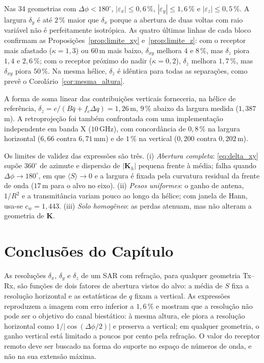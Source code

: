 \documentclass[12pt,a4paper,oneside]{book}
\theoremstyle{remark}
\newcommand{\vect}[1]{\boldsymbol{#1}}
\theoremstyle{plain}
\theoremstyle{definition}
\begin{document}
Nas 34 geometrias com $\Delta\phi<180^\circ$, $|\varepsilon_x|\le0,6\,\%$,
$|\varepsilon_y|\le1,6\,\%$ e $|\varepsilon_z|\le0,5\,\%$. A largura $\delta_y$ é até
$2\,\%$ maior que $\delta_x$ porque a abertura de duas voltas com raio variável
não é perfeitamente isotrópica. As quatro últimas linhas de cada bloco
confirmam as Proposições~\ref{prop:limite_xy} e~\ref{prop:limite_z}: com o
receptor mais afastado ($\kappa=1,3$) ou $60\,$m mais baixo, $\delta_{xy}$
melhora $4$ e $8\,\%$, mas $\delta_z$ piora $1,4$ e $2,6\,\%$; com o receptor
próximo do nadir ($\kappa=0,2$), $\delta_z$ melhora $1,7\,\%$, mas $\delta_{xy}$
piora $50\,\%$. Na mesma hélice, $\delta_z$ é idêntica para todas as separações,
como prevê o Corolário~\ref{cor:mesma_altura}.

A forma de soma linear das contribuições verticais forneceria, na hélice de
referência, $\delta_z=c/(B\bar q+f_c\Delta q)=1,26\,$m, $9\,\%$ abaixo da largura
medida ($1,387\,$m). A retroprojeção foi também confrontada com uma
implementação independente em banda X ($10\,$GHz), com concordância de
$0,8\,\%$ na largura horizontal ($6,66$ contra $6,71\,$mm) e de $1\,\%$ na
vertical ($0,200$ contra $0,202\,$m).

Os limites de validez das expressões são três. (i) \emph{Abertura completa}:
\eqref{eq:delta_xy} supõe $360^\circ$ de azimute e dispersão de $|\vect K_h|$
pequena frente à média; falha quando $\Delta\phi\to180^\circ$, em que
$\langle S\rangle\to0$ e a largura é fixada pela curvatura residual da frente de
onda ($17\,$m para o alvo no eixo). (ii) \emph{Pesos uniformes}: o ganho de
antena, $1/R^2$ e a transmitância variam pouco ao longo da hélice; com janela
de Hann, usa-se $c_w=1,443$. (iii) \emph{Solo homogêneo}: as perdas atenuam,
mas não alteram a geometria de $\vect K$.

\section{Conclusões do Capítulo}
\label{sec:res_concl}

As resoluções $\delta_x$, $\delta_y$ e $\delta_z$ de um SAR com refração, para
qualquer geometria Tx--Rx, são funções de dois fatores de abertura vistos do
alvo: a média de $S$ fixa a resolução horizontal e as estatísticas de $q$ fixam
a vertical. As expressões reproduzem a imagem com erro inferior a $1,6\,\%$ e
mostram que a resolução não pode ser o objetivo do canal biestático: à mesma
altura, ele piora a resolução horizontal como $1/|\cos(\Delta\phi/2)|$ e
preserva a vertical; em qualquer geometria, o ganho vertical está limitado a
poucos por cento pela refração. O valor do receptor remoto deve ser buscado na
forma do suporte no espaço de números de onda, e não na sua extensão máxima.
\end{document}
